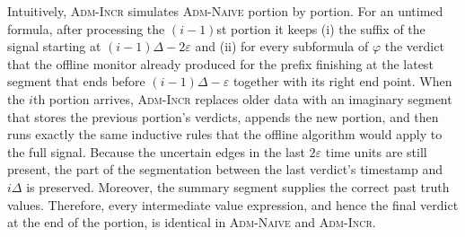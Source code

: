 \documentclass[iicol,lineno]{sn-jnl}
\renewcommand{\pfx}{\textsf{prefix}}
\newcommand{\last}{\textsf{last}}
\newcommand{\hb}{\rightsquigarrow}
\newcommand{\?}{\text{?}}
\newcommand{\defeq}{\coloneqq}
\begin{document}
	
	Intuitively, \textsc{Adm-Incr} simulates \textsc{Adm-Naive} portion by portion.
	For an untimed formula, after processing the $(i-1)$st portion it keeps (i) the suffix of the signal starting at $(i-1)\Delta - 2\varepsilon$ and (ii) for every subformula of $\varphi$ the verdict that the offline monitor already produced for the prefix finishing at the latest segment that ends before $(i-1)\Delta - \varepsilon$ together with its right end point.
	When the $i$th portion arrives, \textsc{Adm-Incr} replaces older data with an imaginary segment that stores the previous portion's verdicts, appends the new portion, and then runs exactly the same inductive rules that the offline algorithm would apply to the full signal.
	Because the uncertain edges in the last $2\varepsilon$ time units are still present, the part of the segmentation between the last verdict's timestamp and $i\Delta$ is preserved.
	Moreover, the summary segment supplies the correct past truth values.
	Therefore, every intermediate value expression, and hence the final verdict at the end of the portion, is identical in \textsc{Adm-Naive} and \textsc{Adm-Incr}.
	
\end{document}

